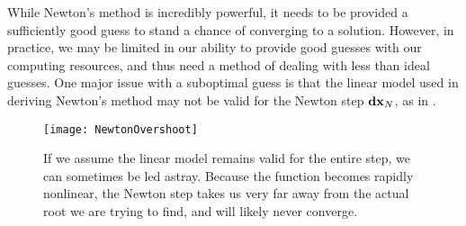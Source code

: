  While Newton's method is incredibly powerful, it needs to be provided a sufficiently good guess to stand a chance of converging to a solution. However, in practice, we may be limited in our ability to provide good guesses with our computing resources, and thus need a method of dealing with less than ideal guesses. One major issue with a suboptimal guess is that the linear model used in deriving Newton's method may not be valid for the Newton step $\mathbf{dx}_N$, as in . 
  \begin{figure}[h]
 \texttt{[image: NewtonOvershoot]}
 \caption{If we assume the linear model remains valid for the entire step, we can sometimes be led astray. Because the function becomes rapidly nonlinear, the Newton step takes us very far away from the actual root we are trying to find, and will likely never converge.}\label{fig:NewtonOvershoot}
 \end{figure}
 
